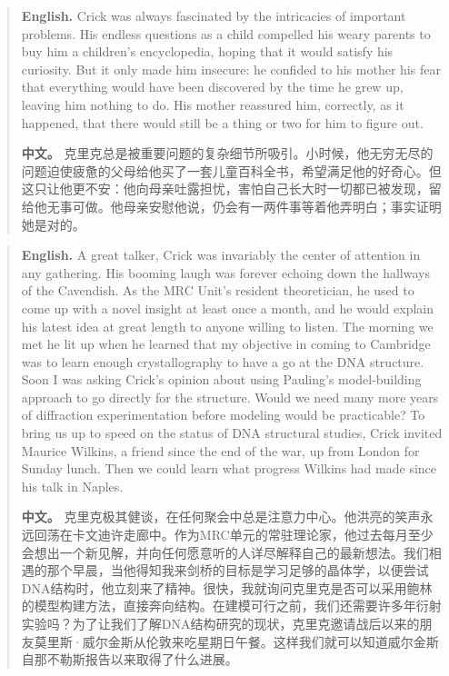 \begin{quote}
\noindent\textbf{English.} Crick was always fascinated by the intricacies of important problems. His endless questions as a child compelled his weary parents to buy him a children's encyclopedia, hoping that it would satisfy his curiosity. But it only made him insecure: he confided to his mother his fear that everything would have been discovered by the time he grew up, leaving him nothing to do. His mother reassured him, correctly, as it happened, that there would still be a thing or two for him to figure out.

\smallskip
\noindent\textbf{中文。} 克里克总是被重要问题的复杂细节所吸引。小时候，他无穷无尽的问题迫使疲惫的父母给他买了一套儿童百科全书，希望满足他的好奇心。但这只让他更不安：他向母亲吐露担忧，害怕自己长大时一切都已被发现，留给他无事可做。他母亲安慰他说，仍会有一两件事等着他弄明白；事实证明她是对的。
\end{quote}

\begin{quote}
\noindent\textbf{English.} A great talker, Crick was invariably the center of attention in any gathering. His booming laugh was forever echoing down the hallways of the Cavendish. As the MRC Unit's resident theoretician, he used to come up with a novel insight at least once a month, and he would explain his latest idea at great length to anyone willing to listen. The morning we met he lit up when he learned that my objective in coming to Cambridge was to learn enough crystallography to have a go at the DNA structure. Soon I was asking Crick's opinion about using Pauling's model-building approach to go directly for the structure. Would we need many more years of diffraction experimentation before modeling would be practicable? To bring us up to speed on the status of DNA structural studies, Crick invited Maurice Wilkins, a friend since the end of the war, up from London for Sunday lunch. Then we could learn what progress Wilkins had made since his talk in Naples.

\smallskip
\noindent\textbf{中文。} 克里克极其健谈，在任何聚会中总是注意力中心。他洪亮的笑声永远回荡在卡文迪许走廊中。作为MRC单元的常驻理论家，他过去每月至少会想出一个新见解，并向任何愿意听的人详尽解释自己的最新想法。我们相遇的那个早晨，当他得知我来剑桥的目标是学习足够的晶体学，以便尝试DNA结构时，他立刻来了精神。很快，我就询问克里克是否可以采用鲍林的模型构建方法，直接奔向结构。在建模可行之前，我们还需要许多年衍射实验吗？为了让我们了解DNA结构研究的现状，克里克邀请战后以来的朋友莫里斯·威尔金斯从伦敦来吃星期日午餐。这样我们就可以知道威尔金斯自那不勒斯报告以来取得了什么进展。
\end{quote}

